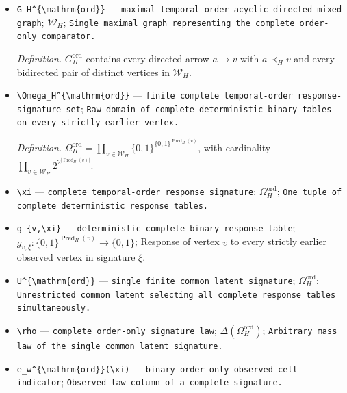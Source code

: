 \documentclass{article}
\begin{document}
\begin{itemize}
  \par\smallskip\noindent\emph{Definition.} \(\operatorname{Pred}_H(v)=\{a\in\mathcal W_H:a\prec_H v\}\).
  \item \texttt{G\_\allowbreak{}H\textasciicircum{}\{\textbackslash{}\allowbreak{}mathrm\{ord\}\allowbreak{}\}\allowbreak{}} --- \texttt{maximal temporal-\allowbreak{}order acyclic directed mixed graph}; \(\mathcal W_H\); \texttt{Single maximal graph representing the complete order-\allowbreak{}only comparator.}
  \par\smallskip\noindent\emph{Definition.} \(G_H^{\mathrm{ord}}\) contains every directed arrow \(a\to v\) with \(a\prec_H v\) and every bidirected pair of distinct vertices in \(\mathcal W_H\).
  \item \texttt{\textbackslash{}\allowbreak{}Omega\_\allowbreak{}H\textasciicircum{}\{\textbackslash{}\allowbreak{}mathrm\{ord\}\allowbreak{}\}\allowbreak{}} --- \texttt{finite complete temporal-\allowbreak{}order response-\allowbreak{}signature set}; \texttt{Raw domain of complete deterministic binary tables on every strictly earlier vertex.}
  \par\smallskip\noindent\emph{Definition.} \(\Omega_H^{\mathrm{ord}}=\prod_{v\in\mathcal W_H}\{0,1\}^{\{0,1\}^{\operatorname{Pred}_H(v)}}\), with cardinality \(\prod_{v\in\mathcal W_H}2^{2^{|\operatorname{Pred}_H(v)|}}\).
  \item \texttt{\textbackslash{}\allowbreak{}xi} --- \texttt{complete temporal-\allowbreak{}order response signature}; \(\Omega_H^{\mathrm{ord}}\); \texttt{One tuple of complete deterministic response tables.}
  \item \texttt{g\_\allowbreak{}\{v,\allowbreak{}\textbackslash{}\allowbreak{}xi\}\allowbreak{}} --- \texttt{deterministic complete binary response table}; \(g_{v,\xi}:\{0,1\}^{\operatorname{Pred}_H(v)}\to\{0,1\}\); Response of vertex \(v\) to every strictly earlier observed vertex in signature \(\xi\).
  \item \texttt{U\textasciicircum{}\{\textbackslash{}\allowbreak{}mathrm\{ord\}\allowbreak{}\}\allowbreak{}} --- \texttt{single finite common latent signature}; \(\Omega_H^{\mathrm{ord}}\); \texttt{Unrestricted common latent selecting all complete response tables simultaneously.}
  \item \texttt{\textbackslash{}\allowbreak{}rho} --- \texttt{complete order-\allowbreak{}only signature law}; \(\Delta(\Omega_H^{\mathrm{ord}})\); \texttt{Arbitrary mass law of the single common latent signature.}
  \item \texttt{e\_\allowbreak{}w\textasciicircum{}\{\textbackslash{}\allowbreak{}mathrm\{ord\}\allowbreak{}\}\allowbreak{}(\textbackslash{}\allowbreak{}xi)} --- \texttt{binary order-\allowbreak{}only observed-\allowbreak{}cell indicator}; \texttt{Observed-\allowbreak{}law column of a complete signature.}

\end{itemize}
\end{document}
